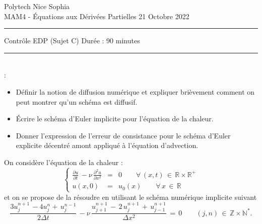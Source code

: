 \documentclass[12pt,a4paper]{article}
\begin{document}
 \hfill Polytech Nice Sophia\\
\noindent MAM4 - \'Equations aux D\'eriv\'ees Partielles \hfill 
21 Octobre 2022 \\

\hrule

\vspace{0.8cm}
\centerline {\large \sc Contrôle EDP (Sujet C) Dur\'ee : 90 minutes}
\vspace{0.8cm}


\hrule
\vspace{0.5cm}
\\

:
\begin{itemize}
\item Définir la notion de diffusion numérique et expliquer brièvement comment on peut montrer qu'un schéma est diffusif.
\item Écrire le schéma d'Euler implicite pour l'équation de la chaleur.
\item Donner l'expression de l'erreur de consistance pour le schéma d'Euler explicite décentré amont appliqué à l'équation d'advection.
\end{itemize}

\vspace{0.5 cm}



\noindent On consid\`ere l'\'equation de la chaleur :
\begin{equation} \label{eqn:chaleur}
\left\{
\begin{array}{rcl}
\displaystyle \frac{\partial u}{\partial t} \, - \nu\, \frac{\partial^2 u}{\partial x^2}  & =  & 0  \qquad \forall \, (x,t) \, \in \, \mathbb{R} \times \mathbb{R}^+ \\
\displaystyle u(x,0)  & =  & u_0(x)  \qquad \forall \, x \, \in \, \mathbb{R}
\end{array}
\right.
\end{equation}
et on se propose de la r\'esoudre en utilisant le sch\'ema num\'erique implicite suivant
\begin{equation} \label{eqn:schema2}
\displaystyle  \frac{3u_j^{n+1} \, - 4u_j^n + \, u_j^{n-1}}{2 \Delta t} \, - \nu\,  \frac{u_{j+1}^{n+1} \,- \,  2 \, u_j^{n+1} \, + \, u_{j-1}^{n+1}}{\Delta x ^2 } \,  =  \,   0 \qquad (j,n) \, \in \, \mathbb{Z} \times \mathbb{N}^* .
\end{equation}
\end{document}
